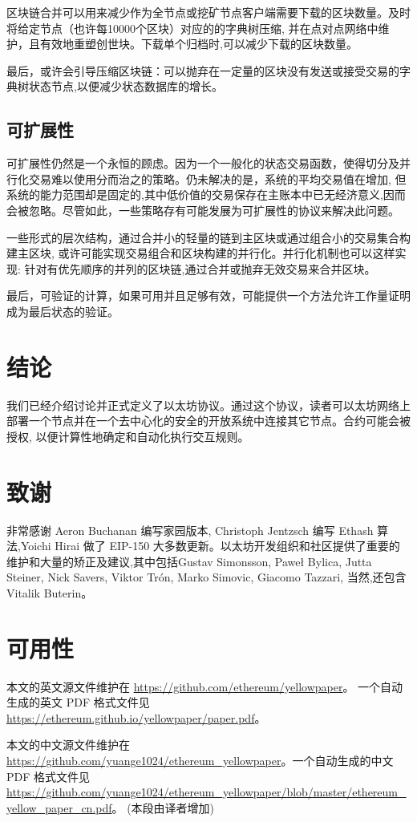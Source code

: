 \documentclass[9pt,oneside]{amsart}
\begin{document}
\begin{multicols}{2}
区块链合并可以用来减少作为全节点或挖矿节点客户端需要下载的区块数量。及时将给定节点（也许每10000个区块）对应的的字典树压缩, 并在点对点网络中维护，且有效地重塑创世块。下载单个归档时,可以减少下载的区块数量。

最后，或许会引导压缩区块链：可以抛弃在一定量的区块没有发送或接受交易的字典树状态节点,以便减少状态数据库的增长。

\subsection{可扩展性}
可扩展性仍然是一个永恒的顾虑。因为一个一般化的状态交易函数，使得切分及并行化交易难以使用分而治之的策略。仍未解决的是，系统的平均交易值在增加, 但系统的能力范围却是固定的,其中低价值的交易保存在主账本中已无经济意义,因而会被忽略。尽管如此，一些策略存有可能发展为可扩展性的协议来解决此问题。

一些形式的层次结构，通过合并小的轻量的链到主区块或通过组合小的交易集合构建主区块, 或许可能实现交易组合和区块构建的并行化。并行化机制也可以这样实现: 针对有优先顺序的并列的区块链,通过合并或抛弃无效交易来合并区块。

最后，可验证的计算，如果可用并且足够有效，可能提供一个方法允许工作量证明成为最后状态的验证。

\section{结论} \label{ch:conclusion}
我们已经介绍讨论并正式定义了以太坊协议。通过这个协议，读者可以太坊网络上部署一个节点并在一个去中心化的安全的开放系统中连接其它节点。合约可能会被授权, 以便计算性地确定和自动化执行交互规则。

\section{致谢}

非常感谢 Aeron Buchanan 编写家园版本, Christoph Jentzsch 编写 Ethash 算法,Yoichi Hirai 做了 EIP-150 大多数更新。以太坊开发组织和社区提供了重要的维护和大量的矫正及建议,其中包括Gustav Simonsson, Pawe\l{} Bylica, Jutta Steiner, Nick Savers, Viktor Tr\'{o}n, Marko Simovic, Giacomo Tazzari, 当然,还包含Vitalik Buterin。

\section{可用性}
本文的英文源文件维护在 \url{https://github.com/ethereum/yellowpaper}。 一个自动生成的英文 PDF 格式文件见 \url{https://ethereum.github.io/yellowpaper/paper.pdf}。

本文的中文源文件维护在 \url{https://github.com/yuange1024/ethereum_yellowpaper}。一个自动生成的中文 PDF 格式文件见 \url{https://github.com/yuange1024/ethereum_yellowpaper/blob/master/ethereum_yellow_paper_cn.pdf}。 (本段由译者增加)




\end{multicols}
\end{document}
